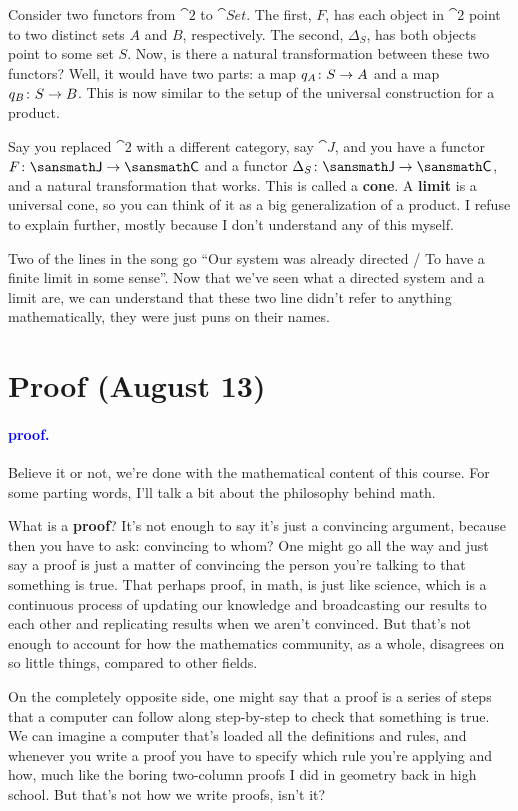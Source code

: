 \documentclass[11pt,paper=letter]{scrartcl}
\renewcommand{\bluebf}[1]{{\bfseries \color{Blue} #1}}
\renewcommand\wp[1]{\paragraph{\textcolor{Blue}{#1.}} \hspace{-1em}}
\newcommand\wl[1]{\label{w:#1}}
\begin{document}
Consider two functors from $\cat{2}$ to $\cat{Set}$. The first, $F$, has each object in $\cat{2}$ point to two distinct sets $A$ and $B$, respectively. The second, $\Delta_S$, has both objects point to some set $S$. Now, is there a natural transformation between these two functors? Well, it would have two parts: a map $q_A \colon S \to A$ and a map $q_B \colon S \to B$. This is now similar to the setup of the universal construction for a product.

Say you replaced $\cat{2}$ with a different category, say $\cat{J}$, and you have a functor $F \from \cat{J} \to \cat{C}$ and a functor $\Delta_S \from \cat{J} \to \cat{C}$, and a natural transformation that works. This is called a \textbf{cone}. A \bluebf{limit} is a universal cone, so you can think of it as a big generalization of a product. I refuse to explain further, mostly because I don't understand any of this myself.

\begin{remboxed}
  Two of the lines in the song go ``Our system was already directed / To have a finite limit in some sense''. Now that we've seen what a directed system and a limit are, we can understand that these two line didn't refer to anything mathematically, they were just puns on their names.
\end{remboxed}

\section{Proof (August 13)}

\wp{proof}
\wl{proof}
Believe it or not, we're done with the mathematical content of this course. For some parting words, I'll talk a bit about the philosophy behind math.

What is a \bluebf{proof}? It's not enough to say it's just a convincing argument, because then you have to ask: convincing to whom? One might go all the way and just say a proof is just a matter of convincing the person you're talking to that something is true. That perhaps proof, in math, is just like science, which is a continuous process of updating our knowledge and broadcasting our results to each other and replicating results when we aren't convinced. But that's not enough to account for how the mathematics community, as a whole, disagrees on so little things, compared to other fields.

On the completely opposite side, one might say that a proof is a series of steps that a computer can follow along step-by-step to check that something is true. We can imagine a computer that's loaded all the definitions and rules, and whenever you write a proof you have to specify which rule you're applying and how, much like the boring two-column proofs I did in geometry back in high school. But that's not how we write proofs, isn't it?
\end{document}
